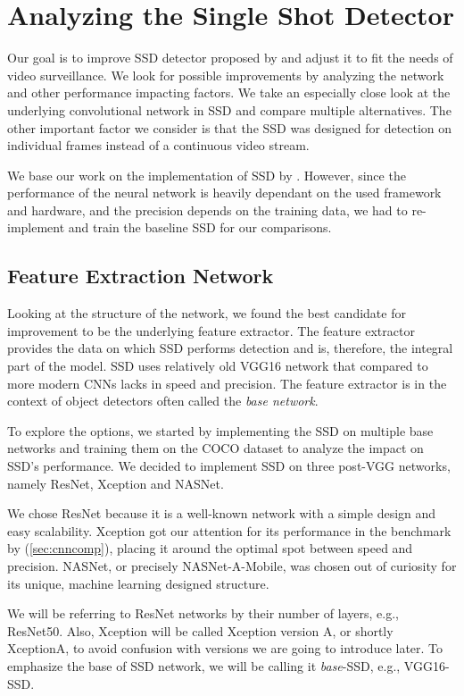 \chapter{Analyzing the Single Shot Detector}
\label{chap:contrib}

Our goal is to improve SSD detector proposed by \citeauthor{bib:ssd} and adjust it to fit the needs of video surveillance. We look for possible improvements by analyzing the network and other performance impacting factors. We take an especially close look at the underlying convolutional network in SSD and compare multiple alternatives. The other important factor we consider is that the SSD was designed for detection on individual frames instead of a continuous video stream.

We base our work on the implementation of SSD by \citeauthor{bib:ssd}. However, since the performance of the neural network is heavily dependant on the used framework and hardware, and the precision depends on the training data, we had to re-implement and train the baseline SSD for our comparisons.

\section{Feature Extraction Network}
\label{sec:base}
Looking at the structure of the network, we found the best candidate for improvement to be the underlying feature extractor. The feature extractor provides the data on which SSD performs detection and is, therefore, the integral part of the model. SSD uses relatively old VGG16 network that compared to more modern CNNs lacks in speed and precision.  The feature extractor is in the context of object detectors often called the \textit{base network}.

To explore the options, we started by implementing the SSD on multiple base networks and training them on the COCO dataset to analyze the impact on SSD's performance. We decided to implement SSD on three post-VGG networks, namely ResNet, Xception and NASNet. 

We chose ResNet because it is a well-known network with a simple design and easy scalability. Xception got our attention for its performance in the benchmark by \citeauthor{bib:cnnbenchmark} (\cref{sec:cnncomp}), placing it around the optimal spot between speed and precision. NASNet, or precisely NASNet-A-Mobile, was chosen out of curiosity for its unique, machine learning designed structure.

We will be referring to ResNet networks by their number of layers, e.g., ResNet50. Also, Xception will be called Xception version A, or shortly XceptionA, to avoid confusion with versions we are going to introduce later. To emphasize the base of SSD network, we will be calling it \textit{base}-SSD, e.g., VGG16-SSD.

